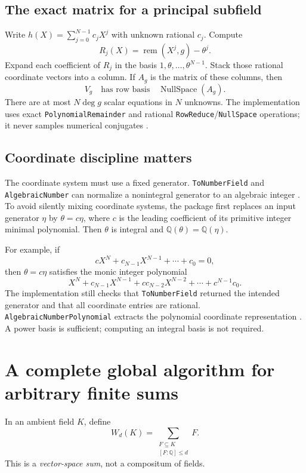 \documentclass[11pt,a4paper]{article}
\newcommand{\Q}{\mathbb Q}
\newcommand{\code}[1]{\texttt{#1}}
\theoremstyle{remark}\newtheorem{remark}[theorem]{Remark}
\begin{document}
\subsection{The exact matrix for a principal subfield}
Write $h(X)=\sum_{j=0}^{N-1}c_jX^j$ with unknown rational $c_j$. Compute
\[
 R_j(X)=\operatorname{rem}(X^j,g)-\theta^j.
\]
Expand each coefficient of $R_j$ in the basis $1,\theta,\ldots,\theta^{N-1}$. Stack those rational coordinate vectors into a column. If $A_g$ is the matrix of these columns, then
\[
 V_g\quad\text{has row basis}\quad\operatorname{NullSpace}(A_g).
\]
There are at most $N\deg g$ scalar equations in $N$ unknowns. The implementation uses exact \code{PolynomialRemainder} and rational \code{RowReduce}/\code{NullSpace} operations; it never samples numerical conjugates \cite{remainder}.

\subsection{Coordinate discipline matters}
The coordinate system must use a fixed generator. \code{ToNumberField} and \code{AlgebraicNumber} can normalize a nonintegral generator to an algebraic integer \cite{tonumberfield,algebraicnumber}. To avoid silently mixing coordinate systems, the package first replaces an input generator $\eta$ by $\theta=c\eta$, where $c$ is the leading coefficient of its primitive integer minimal polynomial. Then $\theta$ is integral and $\Q(\theta)=\Q(\eta)$.

For example, if
\[
 cX^N+c_{N-1}X^{N-1}+\cdots+c_0=0,
\]
then $\theta=c\eta$ satisfies the monic integer polynomial
\[
 X^N+c_{N-1}X^{N-1}+c c_{N-2}X^{N-2}+\cdots+c^{N-1}c_0.
\]
The implementation still checks that \code{ToNumberField} returned the intended generator and that all coordinate entries are rational. \code{AlgebraicNumberPolynomial} extracts the polynomial coordinate representation \cite{anpoly}. A power basis is sufficient; computing an integral basis is not required.

\section{A complete global algorithm for arbitrary finite sums}
\label{sec:global-sum}
In an ambient field $K$, define
\[
 W_d(K)=\sum_{\substack{F\subseteq K\\{}[F:\Q]\le d}} F.
\]
This is a \emph{vector-space sum}, not a compositum of fields.
\end{document}
